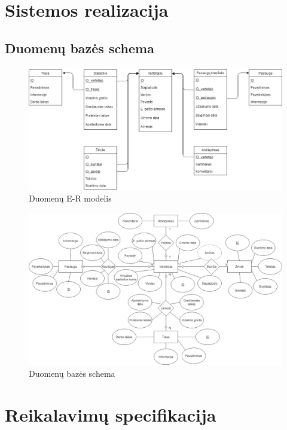 \documentclass[oneside]{VUMIFPSkursinis}
\begin{document}
\section{Sistemos realizacija}
	\subsection{Duomenų bazės schema}
			\begin{figure}[h]
    				\centering
    				\includegraphics[width=1\textwidth]{Database_2.png}
    				\caption{Duomenų E-R modelis}
			\end{figure}
			
			\begin{figure}[h]
    				\centering
    				\includegraphics[width=1\textwidth]{Database2.png}
    				\caption{Duomenų bazės schema}
			\end{figure}
		

\section{Reikalavimų specifikacija}
\end{document}
